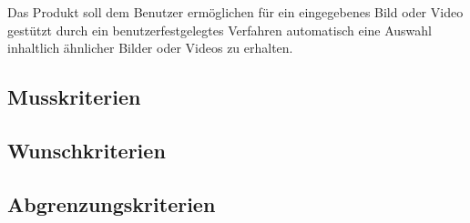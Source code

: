 Das Produkt soll dem Benutzer ermöglichen für ein eingegebenes Bild oder Video gestützt durch ein benutzerfestgelegtes Verfahren automatisch eine Auswahl inhaltlich ähnlicher Bilder oder Videos zu erhalten.
\subsection{Musskriterien}
\subsection{Wunschkriterien}
\subsection{Abgrenzungskriterien}
